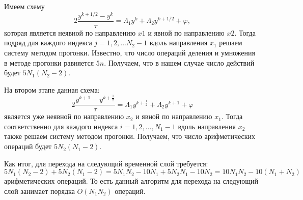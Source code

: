 \documentclass[12pt, a4paper]{article}
\renewcommand{\phi}{\varphi}
\begin{document}
	



	
	Имеем схему 
	\begin{equation} \label{eq1}
		2 \frac{y^{k + 1 / 2} - y^{k}}{\tau} = \Lambda_1 y^{k}  +  \Lambda_2 y^{k+1/2} + \phi,
	\end{equation}
	которая является неявной по направлению $x1$ и явной по направлению $x2$. Тогда подряд для каждого индекса $j = 1, 2, ... N_2 - 1$ вдоль направления $x_1$ решаем систему методом прогонки. 
	Известно, что число операций деления и умножения в методе прогонки равняется $5n$. Получаем, что в нашем случае число действий будет $5N_1(N_2 - 2)$. 
	
	На втором этапе данная схема:
	\[
	2 \frac{y^{k+1} - y^{k+ \frac{1}{2}} }{ \tau} = \Lambda_1  y^{k+\frac{1}{2}} + \Lambda _2 y^{k+1} + \varphi
	\]
	является уже неявной по направлению $x_2$ и явной по направлению $x_1$. Тогда соответственно для каждого индекса $i = 1, 2, ..., N_1 -1$ вдоль направления $x_2$ также решаем систему методом прогонки. Получаем, что число арифметических операций будет $5N_2(N_1 - 2)$.
	
	
	Как итог, для перехода на следующий временной слой требуется:
	\[
	5N_1(N_2 - 2) + 5N_2(N_1 - 2) = 5 N_1 N_2 - 10 N_1 + 5 N_2 N_1 - 10 N_2 = 10 N_1 N_2 - 10 (N_1 + N_2)
	\]
	арифметических операций. То есть данный алгоритм для перехода на следующий слой занимает порядка $O(N_1 N_2)$ операций. 
	
	\bigskip
	
	
	
	
	
\end{document}
